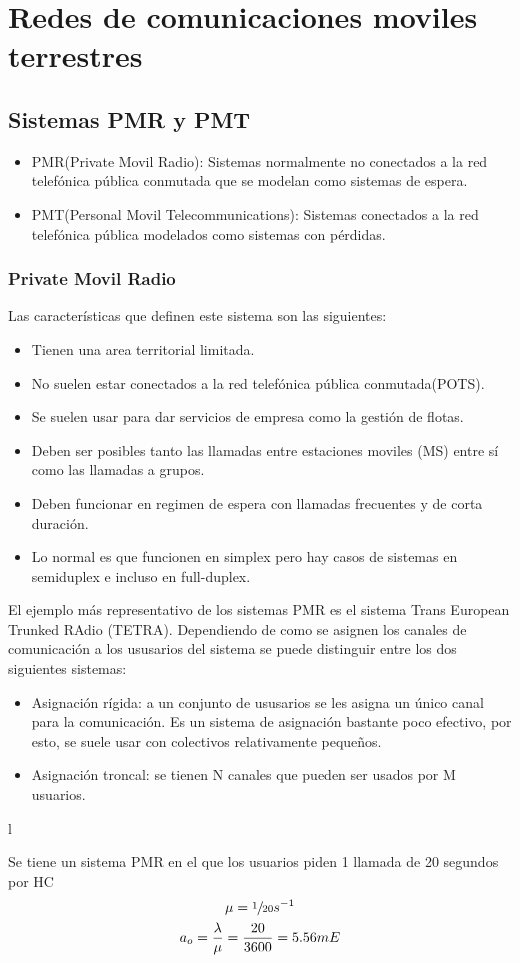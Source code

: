 \section{Redes de comunicaciones moviles terrestres}
\subsection{Sistemas PMR y PMT}
\begin{itemize}
\item{PMR(Private Movil Radio):} Sistemas normalmente no conectados a la red telefónica pública conmutada que se modelan como sistemas de espera.
\item{PMT(Personal Movil Telecommunications):} Sistemas conectados a la red telefónica pública modelados como sistemas con pérdidas. 
\end{itemize}
\subsubsection{Private Movil Radio}
\label{ssub:PMR}
Las características que definen este sistema son las siguientes:
\begin{itemize}
	\item Tienen una area territorial limitada.
	\item No suelen estar conectados a la red telefónica pública conmutada(POTS).
	\item Se suelen usar para dar servicios de empresa como la gestión de flotas.
	\item Deben ser posibles tanto las llamadas entre estaciones moviles (MS) entre sí como las llamadas a grupos.
	\item Deben funcionar en regimen de espera con llamadas frecuentes y de corta duración.
	\item Lo normal es que funcionen en simplex pero hay casos de sistemas en semiduplex e incluso en full-duplex.
\end{itemize}
El ejemplo más representativo de los sistemas PMR es el sistema Trans European Trunked RAdio (TETRA). Dependiendo de como se asignen los canales de comunicación a los ususarios del sistema se puede distinguir entre los dos siguientes sistemas:
\begin{itemize}
	\item Asignación rígida: a un conjunto de ususarios se les asigna un único canal para la comunicación. Es un sistema de asignación bastante poco efectivo, por esto, se suele usar con colectivos relativamente pequeños.
	\item Asignación troncal: se tienen N canales que pueden ser usados por M usuarios.
\end{itemize}
l
\begin{example}
Se tiene un sistema PMR en el que los usuarios piden 1 llamada de 20 segundos por HC
\begin{gather*}
	\mu=\sfrac{1}{20}s^{-1}\\
	a_o=\frac{\lambda}{\mu}=\frac{20}{3600}=5.56mE	
\end{gather*}
\end{example}
